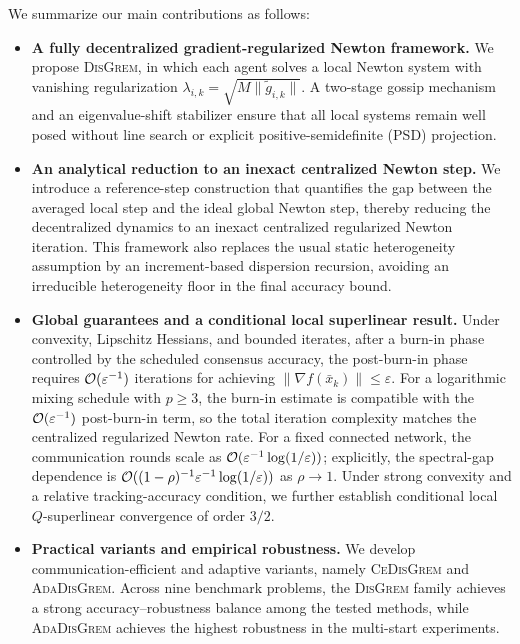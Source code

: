 \documentclass[review,onefignum,onetabnum]{siamart171218}
\begin{document}
	We summarize our main contributions as follows:
	\begin{itemize}[leftmargin=1.5em]
		\item \textbf{A fully decentralized gradient-regularized Newton framework.}
		We propose \textsc{DisGrem}, in which each agent solves a local Newton system
		with vanishing regularization $\lambda_{i,k}=\sqrt{M\|\tilde g_{i,k}\|}$.
		A two-stage gossip mechanism and an eigenvalue-shift stabilizer ensure that
		all local systems remain well posed without line search or explicit positive-semidefinite (PSD) projection.
		
		\item \textbf{An analytical reduction to an inexact centralized Newton step.}
		We introduce a reference-step construction that quantifies the gap between the
		averaged local step and the ideal global Newton step, thereby reducing the
		decentralized dynamics to an inexact centralized regularized Newton iteration.
		This framework also replaces the usual static heterogeneity assumption by an
		increment-based dispersion recursion, avoiding an irreducible
		heterogeneity floor in the final accuracy bound.
		
		\item \textbf{Global guarantees and a conditional local superlinear result.}
		Under convexity, Lipschitz Hessians, and bounded iterates,
		after a burn-in phase controlled by the scheduled consensus accuracy,
		the post-burn-in phase requires $\mathcal{O}(\varepsilon^{-1})$ iterations for
		achieving $\|\nabla f(\bar x_k)\|\le\varepsilon$.
		For a logarithmic mixing schedule with $p\ge3$, the burn-in estimate
		is compatible with the $\mathcal{O}(\varepsilon^{-1})$ post-burn-in term,
		so the total iteration complexity matches the centralized regularized
		Newton rate. For a fixed connected
		network, the communication rounds scale as
		$\mathcal{O}(\varepsilon^{-1}\log(1/\varepsilon))$; explicitly, the
		spectral-gap dependence is
		$\mathcal{O}((1-\rho)^{-1}\varepsilon^{-1}\log(1/\varepsilon))$ as
		$\rho\to1$.
		Under strong convexity and a relative tracking-accuracy condition,
		we further establish conditional local $Q$-superlinear convergence
		of order $3/2$.
		
		\item \textbf{Practical variants and empirical robustness.}
		We develop communication-efficient and adaptive variants, namely
		\textsc{CeDisGrem} and \textsc{AdaDisGrem}. Across nine benchmark problems,
	the \textsc{DisGrem} family achieves a strong accuracy--robustness
	balance among the tested methods, while \textsc{AdaDisGrem} achieves the
		highest robustness in the multi-start experiments.
	\end{itemize}
	
\end{document}
